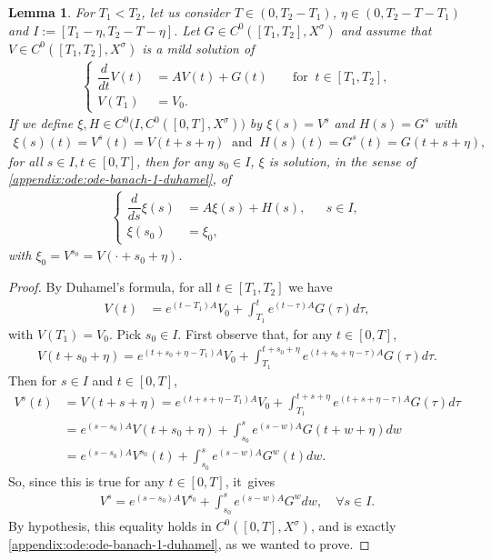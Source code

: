 \documentclass[11pt]{article}
\newtheorem{lemma}[theorem]{Lemma}
\theoremstyle{definition}
\begin{document}
\begin{lemma}\label{lmtranslat}
For $T_1<T_2$, let us consider $T\in (0, T_2-T_1)$, $\eta\in (0, T_2-T-T_1)$ and $I:=[T_1-\eta, T_2-T-\eta]$. Let $G\in C^{0}([T_{1},T_{2}],X^{\sigma})$ and assume that $V\in C^{0}([T_{1},T_{2}],X^{\sigma})$ is a mild solution of
\begin{align*}
\left\{\begin{aligned}
\dfrac{d}{dt}V(t)&=A V(t)+G(t) &&\text{ for }\ t\in [T_1, T_2],\\
V(T_1)&=V_0. &
\end{aligned}\right.
\end{align*}
If we define $\xi,H\in C^{0}\bigl(I, C^{0}([0,T],X^{\sigma})\bigr)$ by $\xi(s)=V^s$ and $H(s)=G^s$ with
\begin{align*}
\xi(s)(t)=V^{s}(t)=V(t+s+\eta)\ \text{ and }\ H(s)(t)=G^{s}(t)=G(t+s+\eta),
\end{align*}
for all $s\in I, t\in [0,T]$, then for any $s_0\in I$, $\xi$ is solution, in the sense of \eqref{appendix:ode:ode-banach-1-duhamel}, of
\begin{align*}
\left\{\begin{aligned}
\dfrac{d}{ds}\xi(s)&=A \xi(s)+H(s), && s\in I, \\
\xi(s_0)&=\xi_0, &
\end{aligned}\right.
\end{align*}
with $\xi_0=V^{s_0}=V(\cdot+s_0+\eta)$.
\end{lemma}
\begin{proof}
By Duhamel's formula, for all $t\in [T_1, T_2]$ we have
\begin{align*}
V(t)&=e^{(t-T_1)A}V_{0}+\int_{T_1}^{t}e^{(t-\tau)A}G(\tau)d\tau,
\end{align*}
with $V(T_1)=V_0$. Pick $s_0\in I$. First observe that, for any $t\in [0, T]$,
\begin{align*}
V(t+s_0+\eta)=e^{(t+s_0+\eta-T_1)A}V_{0}+\int_{T_1}^{t+s_0+\eta}e^{(t+s_0+\eta-\tau)A}G(\tau)d\tau.
\end{align*}
Then for $s\in I$ and $t\in [0, T]$,
\begin{align*}
V^{s}(t)&=V(t+s+\eta)=e^{(t+s+\eta-T_1)A}V_{0}+\int_{T_1}^{t+s+\eta}e^{(t+s+\eta-\tau)A}G(\tau)d\tau\\
&=e^{(s-s_0)A}V(t+s_0+\eta)+\int_{s_0}^{s}e^{(s-w)A}G(t+w+\eta)dw\\
&=e^{(s-s_0)A}V^{s_0}(t)+\int_{s_0}^{s}e^{(s-w)A}G^{w}(t)dw.
\end{align*}
So, since this is true for any $t\in [0,T]$, it~gives
\begin{align*}
V^{s}=e^{(s-s_0)A}V^{s_0}+\int_{s_0}^{s}e^{(s-w)A}G^{w}dw,\quad \forall s\in I.
\end{align*}
By hypothesis, this equality holds in $C^0([0, T], X^\sigma)$, and is exactly \eqref{appendix:ode:ode-banach-1-duhamel}, as we wanted to prove.
\end{proof}
\end{document}
